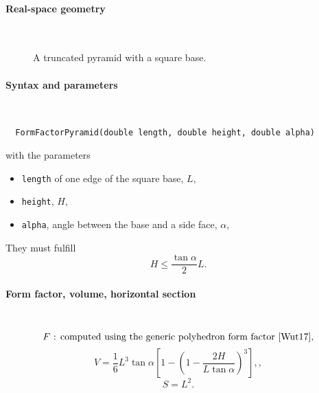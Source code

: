\label{SPyramid}

\paragraph{Real-space geometry}\strut\\

\begin{figure}[H]
\hfill
{}
\hfill
{}
\hfill
{}
\hfill
\caption{A truncated pyramid with a square base.}
\end{figure}

\FloatBarrier

\paragraph{Syntax and parameters}\strut\\[-2ex plus .2ex minus .2ex]
\begin{lstlisting}
  FormFactorPyramid(double length, double height, double alpha)
\end{lstlisting}
with the parameters
\begin{itemize}
\item \texttt{length} of one edge of the square base, $L$,
\item \texttt{height}, $H$,
\item \texttt{alpha}, angle between the base and a side face, $\alpha$,
\end{itemize}
They must fulfill
\begin{displaymath}
  H \le \frac{\tan\alpha}{2}L.
\end{displaymath}

\paragraph{Form factor, volume, horizontal section}\strut\\
\begin{equation*}
  F \text{~: computed using the generic polyhedron form factor~\cite{Wut17},}
\end{equation*}
\begin{equation*}
  V = \dfrac{1}{6}  L^3 \tan\alpha\left[ 1
             - \left(1 - \dfrac{2H}{L\tan\alpha}\right)^3 \right],,
\end{equation*}
\begin{equation*}
  S = L^2.
\end{equation*}

